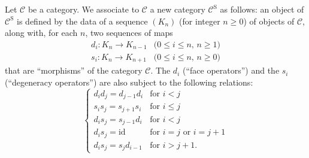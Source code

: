 \documentclass{article}
\theoremstyle{plain}
\theoremstyle{definition}
\newcommand{\cat}[1]{{\mathcal{#1}}}
\newcommand{\id}{\mathrm{id}}
\renewcommand{\SS}{\mathrm{S}}
\renewcommand{\geq}{\geqslant}
\renewcommand{\leq}{\leqslant}
\begin{document}
Let $\cat{C}$ be a category.
We associate to $\cat{C}$ a new category $\cat{C}^\SS$ as follows: an object of $\cat{C}^\SS$ is defined by the data of a sequence $(K_n)$ (for integer $n\geq0$) of objects of $\cat{C}$, along with, for each $n$, two sequences of maps
\[
  \begin{array}{ll}
    d_i\colon K_n \to K_{n-1}
    & \mbox{($0\leq i\leq n$, $n\geq1$)}
  \\s_i\colon K_n \to K_{n+1}
    & \mbox{($0\leq i\leq n$, $n\geq0$)}
  \end{array}
\]
that are ``morphisms'' of the category $\cat{C}$.
The $d_i$ (``face operators'') and the $s_i$ (``degeneracy operators'') are also subject to the following relations:
\[
\label{equation1}
  \begin{cases}
    d_i d_j = d_{j-1} d_i &\mbox{for $i<j$}
  \\s_i s_j = s_{j+1} s_i &\mbox{for $i\leq j$}
  \\d_i s_j = s_{j-1} d_i &\mbox{for $i<j$}
  \\d_i s_j = \id &\mbox{for $i=j$ or $i=j+1$}
  \\d_i s_j = s_j d_{i-1} &\mbox{for $i>j+1$.}
  \end{cases}
\tag{1}
\]
\end{document}
